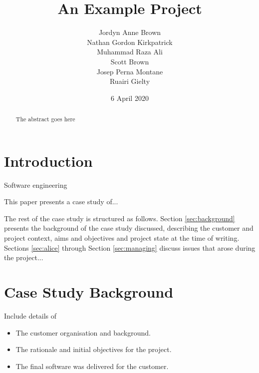 \documentclass{l3proj}
\begin{document}
\title{An Example Project}

\author{Jordyn Anne Brown \\
        Nathan Gordon Kirkpatrick \\
        Muhammad Raza Ali \\
        Scott Brown \\
        Josep Perna Montane\\
        Ruairi Gielty}
\date{6 April 2020}

\maketitle

\begin{abstract}

The abstract goes here

\end{abstract}

\educationalconsent

\newpage

\section{Introduction}

Software engineering

This paper presents a case study of...


The rest of the case study is structured as follows.  Section
\ref{sec:background} presents the background of the case study
discussed, describing the customer and project context, aims and
objectives and project state at the time of writing.  Sections
\ref{sec:alice} through Section \ref{sec:managing} discuss issues that
arose during the project...



\section{Case Study Background}

Include details of

\begin{itemize}
\item The customer organisation and background.
\item The rationale and initial objectives for the project.
\item The final software was delivered for the customer.
\end{itemize}
\end{document}
